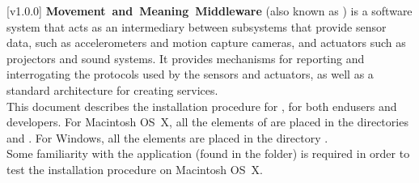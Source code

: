 [v1.0.0]
\textbf{Movement~and~Meaning~Middleware} (also known as \mplusm) is a software system
that acts as an intermediary between subsystems that provide sensor data, such as
accelerometers and motion capture cameras, and actuators such as projectors and sound
systems.
It provides mechanisms for reporting and interrogating the protocols used by the sensors
and actuators, as well as a standard architecture for creating services.\\

This document describes the installation procedure for \mplusm, for both
end\longDash{}users and developers.
For Macintosh OS~X, all the elements of \mplusm{} are placed in the directories
 and .
For Windows, all the elements are placed in the directory
.\\

Some familiarity with the  application (found in the
 folder) is required in order to test the installation
procedure on Macintosh OS~X.
\primaryEnd{}

